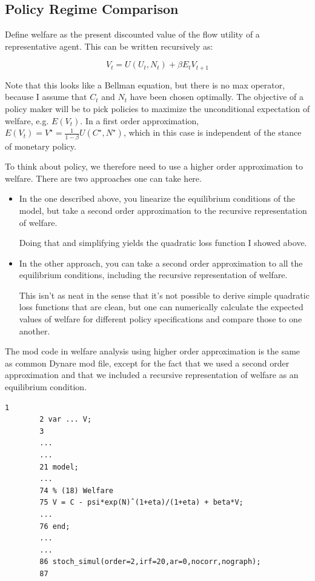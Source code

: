 \documentclass[10pt,math=newtx,citestyle=gb7714-2015,bibstyle=gb7714-2015]{elegantbook}
\begin{document}
{	
	
	\subsection{Policy Regime Comparison}
	
	Define welfare as the present discounted value of the flow utility of a representative agent. This can be written recursively as:
	
	$$V_t=U(U_t,N_t)+\beta E_tV_{t+1}$$
	
	Note that this looks like a Bellman equation, but there is no max operator, because I assume that $C_t$ and $N_t$ have been chosen optimally. The objective of a policy maker will be to pick policies to maximize the unconditional expectation of welfare, e.g. $E(V_t)$. In a first order approximation, $E(V_t) = V^{\star} = \frac{1}{1-\beta}U(C^{\star},N^{\star})$, which in this case is independent of the stance of monetary policy.
	
	To think about policy, we therefore need to use a higher order approximation to welfare. There are two approaches one can take here.
	\begin{itemize}
		\item In the one described above, you linearize the equilibrium conditions of the model, but take a second order approximation to the recursive representation of welfare.
		
		Doing that and simplifying yields the quadratic loss function I showed above.
		\item In the other approach, you can take a second order approximation to all the equilibrium conditions, including the recursive representation of welfare.
		
		This isn't as neat in the sense that it's not possible to derive simple quadratic loss functions that are clean, but one can numerically calculate the expected values of welfare for different policy specifications and compare those to one another.
	\end{itemize}
	
	The mod code in welfare analysis using higher order approximation is the same as common Dynare mod file, except for the fact that we used a second order approximation and that we included a recursive representation of welfare as an equilibrium condition.
	
	\begin{lstlisting}[frame=shadowbox]
		1 
		2 var ... V;
		3
		...
		...
		21 model;
		...
		74 % (18) Welfare
		75 V = C - psi*exp(N)ˆ(1+eta)/(1+eta) + beta*V;
		...
		76 end;
		...
		...
		86 stoch_simul(order=2,irf=20,ar=0,nocorr,nograph);
		87
	\end{lstlisting}
	
}
\end{document}

